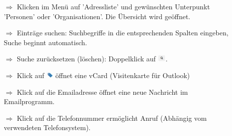 \documentclass{article}
\begin{document}
\begin{multicols}{2}

\begin{tcolorbox}[colback=blue!5,colframe=blue!40!black,title=Adressliste verwenden (Grundfunktionen)]
\begin{itemize}
  \item[$\Longrightarrow$] Klicken im Menü auf 'Adressliste' und gewünschten Unterpunkt 'Personen' oder 'Organisationen'. Die Übersicht wird geöffnet.
  \item[$\Longrightarrow$] Einträge suchen: Suchbegriffe in die entsprechenden Spalten eingeben, Suche beginnt automatisch.
  \item[$\Longrightarrow$] Suche zurücksetzen (löschen): Doppelklick auf \includegraphics[height=10pt]{Icons/Lupe_s.jpg}.
  \item[$\Longrightarrow$] Klick auf \includegraphics[height=10pt]{Icons/vCard.jpg} öffnet eine vCard (Visitenkarte für Outlook) 
	\item[$\Longrightarrow$] Klick auf die Emailadresse öffnet eine neue Nachricht im Emailprogramm.
	\item[$\Longrightarrow$] Klick auf die Telefonnummer ermöglicht Anruf (Abhängig vom verwendeten Telefonsystem).
\end{itemize}
\end{tcolorbox}


\end{multicols}
\end{document}
